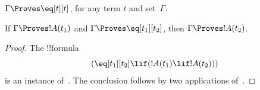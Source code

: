\begin{prop}
 $\Gamma \Proves \eq[t][t]$, for any term $t$ and set~$\Gamma$.
\end{prop}

\begin{prop}
  If $\Gamma \Proves !A(t_1)$ and $\Gamma \Proves
  \eq[t_1][t_2]$, then $\Gamma \Proves !A(t_2)$.
\end{prop}

\begin{proof}
The !!{formula}
\[
(\eq[t_1][t_2] \lif (!A(t_1) \lif !A(t_2)))
\]
is an instance of~. The conclusion follows by two applications
of~\MP.
\end{proof}




\OLEndChapterHook






